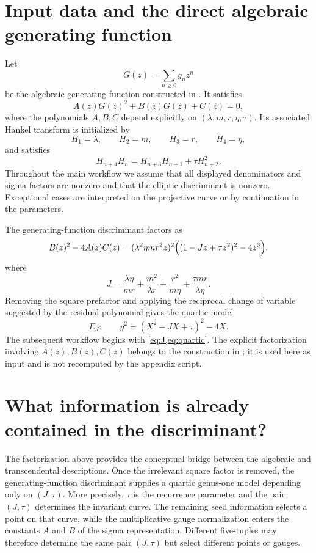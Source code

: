 \documentclass[11pt]{article}
\newcommand{\taupar}{\tau}
\newcommand{\EJ}{E_J}
\begin{document}
\section{Input data and the direct algebraic generating function}
\label{sec:input}
Let
\[
  G(z)=\sum_{n\ge 0}g_nz^n
\]
be the algebraic generating function constructed in \cite{Scheuerle2026}.
It satisfies
\[
  A(z)G(z)^2+B(z)G(z)+C(z)=0,
\]
where the polynomials $A,B,C$ depend explicitly on
$(\lambda,m,r,\eta,\taupar)$. Its associated Hankel transform is initialized by
\[
  H_1=\lambda,\qquad H_2=m,\qquad H_3=r,\qquad H_4=\eta,
\]
and satisfies
\begin{equation}
  H_{n+4}H_n=H_{n+3}H_{n+1}+\taupar H_{n+2}^2.
  \label{eq:somos4}
\end{equation}
Throughout the main workflow we assume that all displayed denominators and
sigma factors are nonzero and that the elliptic discriminant is nonzero.
Exceptional cases are interpreted on the projective curve or by continuation
in the parameters.

The generating-function discriminant factors as
\[
 B(z)^2-4A(z)C(z)
 = (\lambda^2\eta m r^2z)^2
   \Bigl((1-Jz+\taupar z^2)^2-4z^3\Bigr),
\]
where
\begin{equation}
  J=
  \frac{\lambda\eta}{mr}
  +\frac{m^2}{\lambda r}
  +\frac{r^2}{m\eta}
  +\frac{\taupar mr}{\lambda\eta}.
  \label{eq:J}
\end{equation}
Removing the square prefactor and applying the reciprocal change of variable
suggested by the residual polynomial gives the quartic model
\begin{equation}
  \EJ:\qquad y^2=(X^2-JX+\taupar)^2-4X.
  \label{eq:quartic}
\end{equation}
The subsequent workflow begins with \cref{eq:J,eq:quartic}. The explicit
factorization involving $A(z),B(z),C(z)$ belongs to the construction in
\cite{Scheuerle2026}; it is used here as input and is not recomputed by the
appendix script.

\section{What information is already contained in the discriminant?}
\label{sec:discriminant}
The factorization above provides the conceptual bridge between the algebraic
and transcendental descriptions. Once the irrelevant square factor is
removed, the generating-function discriminant supplies a quartic genus-one
model depending only on $(J,\taupar)$. More precisely, $\taupar$ is the
recurrence parameter and the pair $(J,\taupar)$ determines the invariant
curve. The remaining seed information selects a point on that curve, while
the multiplicative gauge normalization enters the constants $A$ and $B$ of
the sigma representation. Different five-tuples may therefore determine the
same pair $(J,\taupar)$ but select different points or gauges.
\end{document}
